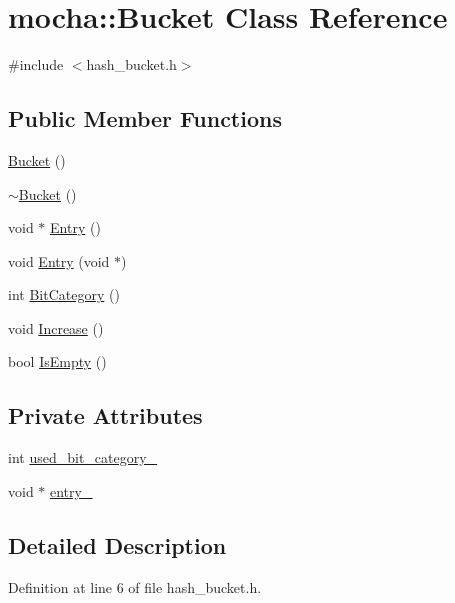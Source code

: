 \hypertarget{classmocha_1_1_bucket}{
\section{mocha::Bucket Class Reference}
\label{classmocha_1_1_bucket}
}


{\ttfamily \#include $<$hash\_\-bucket.h$>$}

\subsection*{Public Member Functions}
\begin{DoxyCompactItemize}
\item 
\hyperlink{classmocha_1_1_bucket_a5ba22418fc9399d5268c3bd48e76835b}{Bucket} ()
\item 
\hyperlink{classmocha_1_1_bucket_a18c23f202186bac140024d098f3fe076}{$\sim$Bucket} ()
\item 
void $\ast$ \hyperlink{classmocha_1_1_bucket_a5e09be08c29e1cc7fc4cd3e435bc60f5}{Entry} ()
\item 
void \hyperlink{classmocha_1_1_bucket_a99ff3c1980e20a1e2bc8fb7823ddab8c}{Entry} (void $\ast$)
\item 
int \hyperlink{classmocha_1_1_bucket_a25165523768f5259b97f897d8a63e29c}{BitCategory} ()
\item 
void \hyperlink{classmocha_1_1_bucket_a14e3746dd63320149e582a576ed29b6b}{Increase} ()
\item 
bool \hyperlink{classmocha_1_1_bucket_aca74d48495c7832520260b656c02a74c}{IsEmpty} ()
\end{DoxyCompactItemize}
\subsection*{Private Attributes}
\begin{DoxyCompactItemize}
\item 
int \hyperlink{classmocha_1_1_bucket_ae29b657e8c125e5523ae2e3331fd915e}{used\_\-bit\_\-category\_\-}
\item 
void $\ast$ \hyperlink{classmocha_1_1_bucket_ae83e8d2061d4fc8a3be0a5d379909a55}{entry\_\-}
\end{DoxyCompactItemize}


\subsection{Detailed Description}


Definition at line 6 of file hash\_\-bucket.h.



